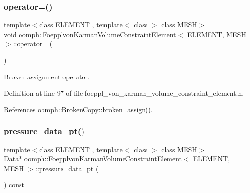 \subsubsection{\texorpdfstring{operator=()}{operator=()}}
{\footnotesize\ttfamily template$<$class E\+L\+E\+M\+E\+NT , template$<$ class $>$ class M\+E\+SH$>$ \\
void \hyperlink{classoomph_1_1FoepplvonKarmanVolumeConstraintElement}{oomph\+::\+Foepplvon\+Karman\+Volume\+Constraint\+Element}$<$ E\+L\+E\+M\+E\+NT, M\+E\+SH $>$\+::operator= (\begin{DoxyParamCaption}\item[{const \hyperlink{classoomph_1_1FoepplvonKarmanVolumeConstraintElement}{Foepplvon\+Karman\+Volume\+Constraint\+Element}$<$ E\+L\+E\+M\+E\+NT, M\+E\+SH $>$ \&}]{ }\end{DoxyParamCaption})\hspace{0.3cm}{\ttfamily [inline]}}



Broken assignment operator. 



Definition at line 97 of file foeppl\+\_\+von\+\_\+karman\+\_\+volume\+\_\+constraint\+\_\+element.\+h.



References oomph\+::\+Broken\+Copy\+::broken\+\_\+assign().

\mbox{\label{classoomph_1_1FoepplvonKarmanVolumeConstraintElement_a092ba84924e8389c573eb232d3ec640c}} 
\subsubsection{\texorpdfstring{pressure\+\_\+data\+\_\+pt()}{pressure\_data\_pt()}}
{\footnotesize\ttfamily template$<$class E\+L\+E\+M\+E\+NT , template$<$ class $>$ class M\+E\+SH$>$ \\
\hyperlink{classoomph_1_1Data}{Data}$\ast$ \hyperlink{classoomph_1_1FoepplvonKarmanVolumeConstraintElement}{oomph\+::\+Foepplvon\+Karman\+Volume\+Constraint\+Element}$<$ E\+L\+E\+M\+E\+NT, M\+E\+SH $>$\+::pressure\+\_\+data\+\_\+pt (\begin{DoxyParamCaption}{ }\end{DoxyParamCaption}) const\hspace{0.3cm}{\ttfamily [inline]}}



